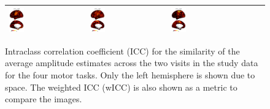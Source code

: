 \documentclass{article}
\begin{document}
\begin{figure}
\begin{tabularx}{\textwidth}{|m{1em}|X|X|X|X|}
			\includegraphics[width=0.2\textwidth]{plots/602_tongue_icc_classical_avg_left.png} &
			\includegraphics[width=0.2\textwidth]{plots/602_foot_icc_classical_avg_left.png} &
			\includegraphics[width=0.2\textwidth]{plots/602_hand_icc_classical_avg_left.png} \\ \hline
		\end{tabularx}	
		\caption{Intraclass correlation coefficient (ICC) for the similarity of the average amplitude estimates across the two visits in the study data for the four motor tasks. Only the left hemisphere is shown due to space. The weighted ICC (wICC) is also shown as a metric to compare the images.}
		\label{fig:icc}
	\end{figure}
\end{document}
